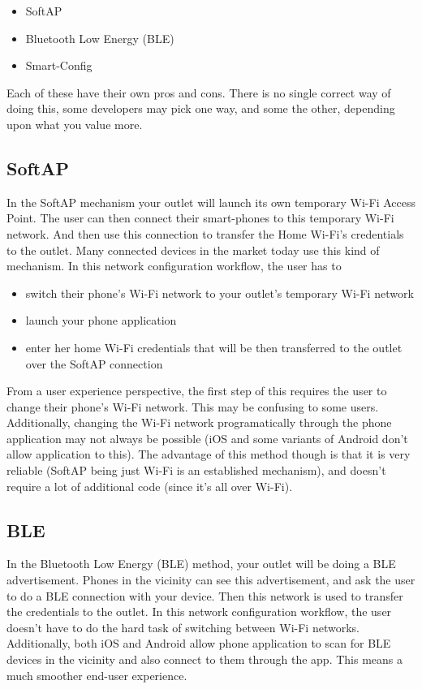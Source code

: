 \documentclass[main.tex]{subfiles}
\begin{document}
\begin{itemize}
    \item SoftAP 
    \item Bluetooth Low Energy (BLE)
    \item Smart-Config
\end{itemize}

Each of these have their own pros and cons. There is no single correct way of doing this, some developers may pick one way, and some the other, depending upon what you value more.

\subsection{SoftAP}
In the SoftAP mechanism your outlet will launch its own temporary Wi-Fi Access Point. The user can then connect their smart-phones to this temporary Wi-Fi network. And then use this connection to transfer the Home Wi-Fi's credentials to the outlet. Many connected devices in the market today use this kind of mechanism. In this network configuration workflow, the user has to 
\begin{itemize}
    \item switch their phone's Wi-Fi network to your outlet's temporary Wi-Fi network
    \item launch your phone application
    \item enter her home Wi-Fi credentials that will be then transferred to the outlet over the SoftAP connection
\end{itemize}
From a user experience perspective, the first step of this requires the user to change their phone's Wi-Fi network. This may be confusing to some users. Additionally, changing the Wi-Fi network programatically through the phone application may not always be possible (iOS and some variants of Android don't allow application to this). The advantage of this method though is that it is very reliable (SoftAP being just Wi-Fi is an established mechanism), and doesn't require a lot of additional code (since it's all over Wi-Fi).

\subsection{BLE}

In the Bluetooth Low Energy (BLE) method, your outlet will be doing a BLE advertisement. Phones in the vicinity can see this advertisement, and ask the user to do a BLE connection with your device. Then this network is used to transfer the credentials to the outlet.
In this network configuration workflow, the user doesn't have to do the hard task of switching between Wi-Fi networks. Additionally, both iOS and Android allow phone application to scan for BLE devices in the vicinity and also connect to them through the app. This means a much smoother end-user experience.
\end{document}
